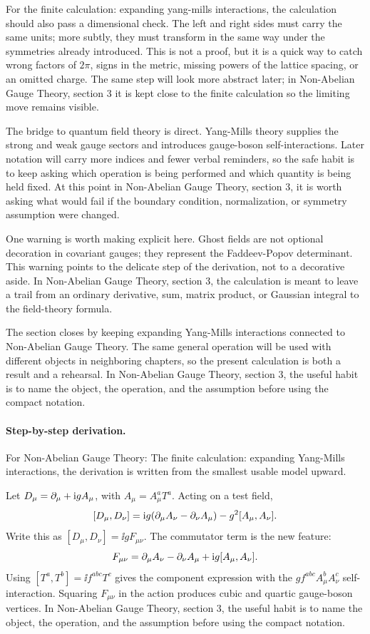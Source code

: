 For the finite calculation: expanding yang-mills interactions, the calculation should also pass a dimensional check.  The left and right sides must carry the same units; more subtly, they must transform in the same way under the symmetries already introduced.  This is not a proof, but it is a quick way to catch wrong factors of \(2\pi\), signs in the metric, missing powers of the lattice spacing, or an omitted charge.  The same step will look more abstract later; in Non-Abelian Gauge Theory, section 3 it is kept close to the finite calculation so the limiting move remains visible.

The bridge to quantum field theory is direct.  Yang-Mills theory supplies the strong and weak gauge sectors and introduces gauge-boson self-interactions.  Later notation will carry more indices and fewer verbal reminders, so the safe habit is to keep asking which operation is being performed and which quantity is being held fixed.  At this point in Non-Abelian Gauge Theory, section 3, it is worth asking what would fail if the boundary condition, normalization, or symmetry assumption were changed.

One warning is worth making explicit here.  Ghost fields are not optional decoration in covariant gauges; they represent the Faddeev-Popov determinant.  This warning points to the delicate step of the derivation, not to a decorative aside.  In Non-Abelian Gauge Theory, section 3, the calculation is meant to leave a trail from an ordinary derivative, sum, matrix product, or Gaussian integral to the field-theory formula.

The section closes by keeping expanding Yang-Mills interactions connected to Non-Abelian Gauge Theory.  The same general operation will be used with different objects in neighboring chapters, so the present calculation is both a result and a rehearsal.  In Non-Abelian Gauge Theory, section 3, the useful habit is to name the object, the operation, and the assumption before using the compact notation.



\paragraph{Step-by-step derivation.}

For Non-Abelian Gauge Theory: The finite calculation: expanding Yang-Mills interactions, the derivation is written from the smallest usable model upward.

Let \(D_\mu=\partial_\mu+\mathrm i gA_\mu\), with \(A_\mu=A_\mu^aT^a\).  Acting on a test field,
\[
  [D_\mu,D_\nu]
  =
  \mathrm i g(\partial_\mu A_\nu-\partial_\nu A_\mu)-g^2[A_\mu,A_\nu].
\]
Write this as \([D_\mu,D_\nu]=\ii gF_{\mu\nu}\).  The commutator term is the new feature:
\[
  F_{\mu\nu}=\partial_\mu A_\nu-\partial_\nu A_\mu+\mathrm i g[A_\mu,A_\nu].
\]
Using \([T^a,T^b]=\ii f^{abc}T^c\) gives the component expression with the \(gf^{abc}A_\mu^bA_\nu^c\) self-interaction.  Squaring \(F_{\mu\nu}\) in the action produces cubic and quartic gauge-boson vertices.  In Non-Abelian Gauge Theory, section 3, the useful habit is to name the object, the operation, and the assumption before using the compact notation.

